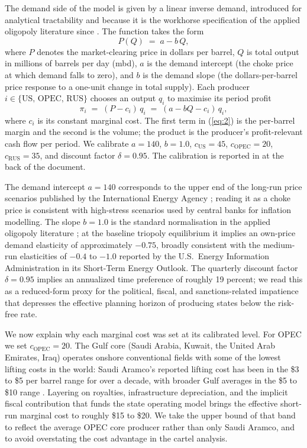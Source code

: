The demand side of the model is given by a linear inverse demand,
introduced for analytical tractability and because it is the workhorse
specification of the applied oligopoly literature since
\citet[p.~??]{cournot1838}. The function takes the form
\begin{equation}
P(Q) \;=\; a - b\,Q,
\label{eq:1}
\end{equation}
where $P$ denotes the market-clearing price in dollars per barrel,
$Q$ is total output in millions of barrels per day (mbd), $a$ is the
demand intercept (the choke price at which demand falls to zero), and
$b$ is the demand slope (the dollars-per-barrel price response to a
one-unit change in total supply). Each producer
$i \in \{\text{US, OPEC, RUS}\}$ chooses an output $q_i$ to maximise its
period profit
\begin{equation}
\pi_i \;=\; (P - c_i)\, q_i \;=\; (a - b Q - c_i)\, q_i,
\label{eq:2}
\end{equation}
where $c_i$ is its constant marginal cost. The first term in (\ref{eq:2})
is the per-barrel margin and the second is the volume; the product is
the producer's profit-relevant cash flow per period. We calibrate
$a = 140$, $b = 1.0$, $c_{\text{US}} = 45$, $c_{\text{OPEC}} = 20$,
$c_{\text{RUS}} = 35$, and discount factor $\delta = 0.95$. The
calibration is reported in  at the back of the document.

The demand intercept $a = 140$ corresponds to the upper end of the
long-run price scenarios published by the International Energy Agency
\citep{iea2019}; reading it as a choke price is consistent with
high-stress scenarios used by central banks for inflation modelling. The
slope $b = 1.0$ is the standard normalisation in the applied oligopoly
literature \citep[p.~??]{tirole1988}; at the baseline triopoly equilibrium it
implies an own-price demand elasticity of approximately $-0.75$, broadly
consistent with the medium-run elasticities of $-0.4$ to $-1.0$ reported
by the U.S.\ Energy Information Administration in its Short-Term Energy
Outlook. The quarterly discount factor $\delta = 0.95$ implies an
annualized time preference of roughly 19 percent; we read this as a
reduced-form proxy for the political, fiscal, and sanctions-related
impatience that depresses the effective planning horizon of producing
states below the risk-free rate.

We now explain why each marginal cost was set at its calibrated level.
For OPEC we set $c_{\text{OPEC}} = 20$. The Gulf core (Saudi Arabia,
Kuwait, the United Arab Emirates, Iraq) operates onshore conventional
fields with some of the lowest lifting costs in the world: Saudi
Aramco's reported lifting cost has been in the \$3 to \$5 per barrel
range for over a decade, with broader Gulf averages in the \$5 to \$10
range \citep{bp2022,eia2024}. Layering on royalties, infrastructure
depreciation, and the implicit fiscal contribution that funds the state
operating model brings the effective short-run marginal cost to roughly
\$15 to \$20. We take the upper bound of that band to reflect the
average OPEC core producer rather than only Saudi Aramco, and to avoid
overstating the cost advantage in the cartel analysis.

